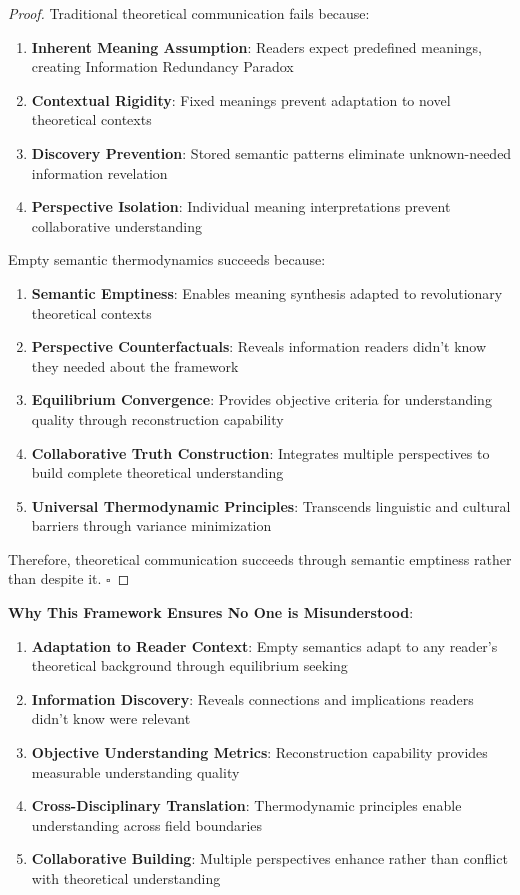 \documentclass[11pt,a4paper]{article}
\begin{document}
\begin{proof}
Traditional theoretical communication fails because:
\begin{enumerate}
\item \textbf{Inherent Meaning Assumption}: Readers expect predefined meanings, creating Information Redundancy Paradox
\item \textbf{Contextual Rigidity}: Fixed meanings prevent adaptation to novel theoretical contexts
\item \textbf{Discovery Prevention}: Stored semantic patterns eliminate unknown-needed information revelation
\item \textbf{Perspective Isolation}: Individual meaning interpretations prevent collaborative understanding
\end{enumerate}

Empty semantic thermodynamics succeeds because:
\begin{enumerate}
\item \textbf{Semantic Emptiness}: Enables meaning synthesis adapted to revolutionary theoretical contexts
\item \textbf{Perspective Counterfactuals}: Reveals information readers didn't know they needed about the framework
\item \textbf{Equilibrium Convergence}: Provides objective criteria for understanding quality through reconstruction capability
\item \textbf{Collaborative Truth Construction}: Integrates multiple perspectives to build complete theoretical understanding
\item \textbf{Universal Thermodynamic Principles}: Transcends linguistic and cultural barriers through variance minimization
\end{enumerate}

Therefore, theoretical communication succeeds through semantic emptiness rather than despite it. $\square$
\end{proof}

\textbf{Why This Framework Ensures No One is Misunderstood}:

\begin{enumerate}
\item \textbf{Adaptation to Reader Context}: Empty semantics adapt to any reader's theoretical background through equilibrium seeking
\item \textbf{Information Discovery}: Reveals connections and implications readers didn't know were relevant
\item \textbf{Objective Understanding Metrics}: Reconstruction capability provides measurable understanding quality
\item \textbf{Cross-Disciplinary Translation}: Thermodynamic principles enable understanding across field boundaries
\item \textbf{Collaborative Building}: Multiple perspectives enhance rather than conflict with theoretical understanding
\end{enumerate}
\end{document}
